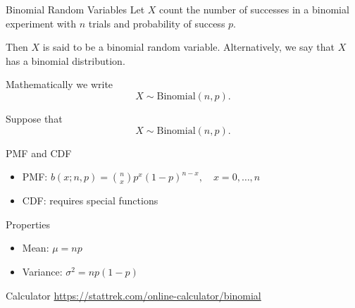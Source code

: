 \begin{frame}
  \begin{block}{Binomial Random Variables}
    Let $X$ count the number of successes in a binomial experiment with $n$ trials and probability of success $p$.

    \bigskip
    
    Then $X$ is said to be a binomial random variable. Alternatively, we say that $X$ has a binomial distribution.

    \bigskip

      Mathematically we write
      $$
      X \sim \mbox{Binomial}(n,p).
      $$

  \end{block}
\end{frame}

\begin{frame}
  Suppose that 
   $$
   X \sim \mbox{Binomial}(n,p).
   $$
  
  \begin{block}{PMF and CDF}
    \begin{itemize}
    \item PMF: $b(x;n,p)=\binom{n}{x}p^x(1-p)^{n-x},\quad x=0,\ldots,n$
    \item CDF: requires special functions
    \end{itemize}
  \end{block}
  
  \begin{block}{Properties}
    \begin{itemize}
    \item Mean: $\mu=np$
    \item Variance: $\sigma^2=np(1-p)$
    \end{itemize}
  \end{block}
  
    \begin{block}{Calculator}
  \url{https://stattrek.com/online-calculator/binomial}
  \end{block}
\end{frame}

